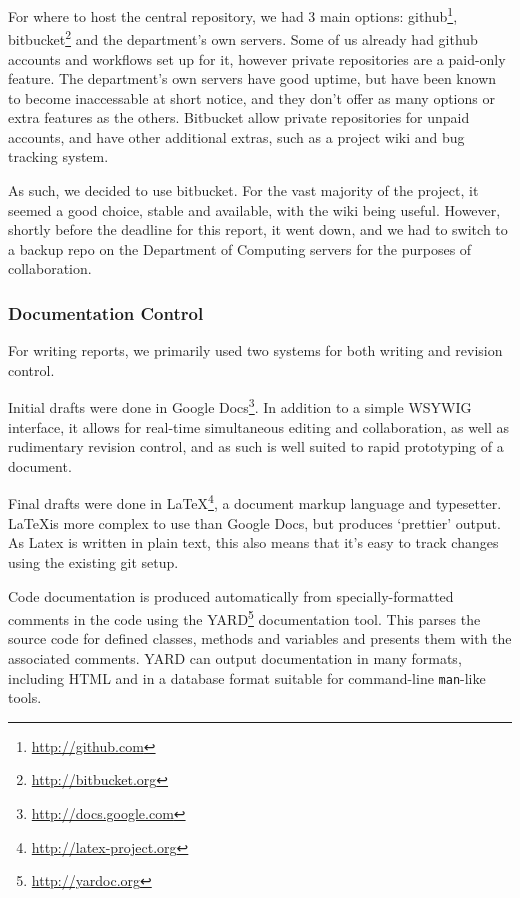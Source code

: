       For where to host the central repository, we had 3 main options: github\footnote{\url{http://github.com}}, bitbucket\footnote{\url{http://bitbucket.org}} and the department's own servers.
      Some of us already had github accounts and workflows set up for it, however private repositories are a paid-only feature.
      The department's own servers have good uptime, but have been known to become inaccessable at short notice, and they don't offer as many options or extra features as the others.
      Bitbucket allow private repositories for unpaid accounts, and have other additional extras, such as a project wiki and bug tracking system.

      As such, we decided to use bitbucket.
      For the vast majority of the project, it seemed a good choice, stable and available, with the wiki being useful.
      However, shortly before the deadline for this report, it went down, and we had to switch to a backup repo on the Department of Computing servers for the purposes of collaboration.  
    \subsubsection{Documentation Control}
      For writing reports, we primarily used two systems for both writing and revision control.

      Initial drafts were done in Google Docs\footnote{\url{http://docs.google.com}}.
      In addition to a simple WSYWIG interface, it allows for real-time simultaneous editing and collaboration, as well as rudimentary revision control, and as such is well suited to rapid prototyping of a document.

      Final drafts were done in \LaTeX\footnote{\url{http://latex-project.org}}, a document markup language and typesetter.
      \LaTeX is more complex to use than Google Docs, but produces `prettier' output. As Latex is written in plain text, this also means that it's easy to track changes using the existing git setup.

      Code documentation is produced automatically from specially-formatted
comments in the code using the YARD\footnote{\url{http://yardoc.org}} documentation tool. This parses the source
code for defined classes, methods and variables and presents them with the
associated comments. YARD can output documentation in many formats, including
HTML and in a database format suitable for command-line \texttt{man}-like tools.

